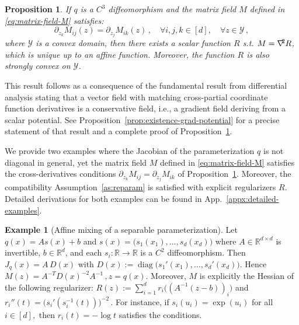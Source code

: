 \documentclass[a4paper,11pt,fullpage]{article}
\def\Y{{\mathcal Y}}
\theoremstyle{plain}
\newtheorem{proposition}{Proposition}
\theoremstyle{definition}
\newtheorem{example}{Example}
\theoremstyle{plain}
\let\nablaold\nabla
\renewcommand{\nabla}{\nablaold\mkern-2.5mu}
\begin{document}
\begin{tcolorbox}[colframe=white!, top=2pt,left=2pt,right=2pt,bottom=2pt] 
\begin{proposition}
\label{prop:matrix-field-eq-Hessian}
If $q$ is a $C^3$ diffeomorphism and the matrix field $M$ defined in \eqref{eq:matrix-field-M} satisfies:  
\begin{equation*}
\partial_{z_k} M_{ij}(z) = \partial_{z_j} M_{ik}(z)\,,\quad \forall i, j, k \in [d],\quad  \forall z \in \Y\,,
\end{equation*}
where $\Y$ is a convex domain, then there exists a scalar function $R$ s.t. $M = \nabla^2 R$, which is unique up to an affine function. Moreover, the function $R$ is also strongly convex on $\Y$. 
\end{proposition}
\end{tcolorbox}

This result follows as a consequence of the fundamental result from differential analysis stating that a vector field with 
matching cross-partial coordinate function derivatives is a conservative field, i.e., a gradient field deriving from a scalar potential.  
See Proposition~\ref{prop:existence-grad-potential} for a precise statement of that result and a complete proof of Proposition~\ref{prop:matrix-field-eq-Hessian}. 

We provide two examples where the Jacobian of the parameterization $q$ is not diagonal in general, yet the matrix field $M$ defined in \eqref{eq:matrix-field-M} satisfies the cross-derivatives conditions $\partial_{z_k}M_{ij}=\partial_{z_j}M_{ik}$ of Proposition~\ref{prop:matrix-field-eq-Hessian}.  
Moreover, the compatibility Assumption~\ref{as:reparam} is satisfied with explicit regularizers $R$. 
Detailed derivations for both examples can be found in App.~\ref{appx:detailed-examples}. 

\begin{example}[Affine mixing of a separable parameterization]
Let $q(x)=As(x)+b$ and $s(x)=\bigl(s_1(x_1),\dots,s_d(x_d)\bigr)$ where \(A\in\mathbb R^{d\times d}\) is invertible, \(b\in\mathbb R^d\), and each
\(s_i:\mathbb R\to\mathbb R\) is a \(C^2\) diffeomorphism. Then $J_q(x)=A\,D(x)$ with $D(x):=\operatorname{diag}\bigl(s_1'(x_1),\dots,s_d'(x_d)\bigr)$. 
Hence $M(z) = A^{-T}D(x)^{-2}A^{-1}\,,z=q(x).$ Moreover, $M$ is explicitly the Hessian of the following regularizer: $R(z):=\sum_{i=1}^d r_i\bigl((A^{-1}(z-b))_i\bigr)$ and $r_i''(t) = \bigl(s_i'(s_i^{-1}(t))\bigr)^{-2}\,.$
For instance, if $s_i(u_i) = \exp(u_i)$ for all $i \in [d],$ then $r_i(t) = - \log t$ satisfies the conditions. 
\end{example}
\end{document}
